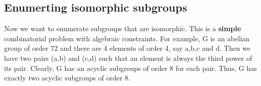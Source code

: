 \documentclass{article}
\begin{document}
\subsection{Enumerting isomorphic subgroups}
Now we want to enumerate subgroups that are isomorphic. This is a \textbf{simple} combinatorial problem with algebraic constraints. For example, G is an abelian group of order 72 and there are 4 elements of order 4, say a,b,c and d. Then we have two pairs (a,b) and (c,d) such that an element is always the third power of its pair. Clearly, G has an acyclic subgroups of order 8 for each pair. Thus, G has exactly two acyclic subgroups of order 8.
\end{document}
